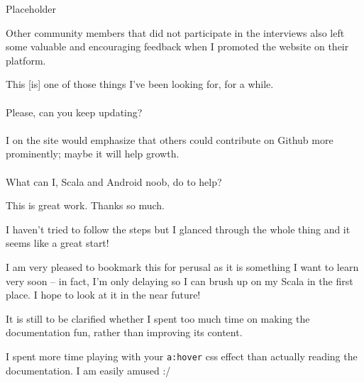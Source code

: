 \hrulefill

\begin{displayquote}

	Placeholder

\end{displayquote}

Other community members that did not participate in the interviews also left some valuable and encouraging feedback when I promoted the website on their platform.

\begin{displayquote}

	This [is] one of those things I've been looking for, for a while. \\\\
	Please, can you keep updating? \\\\
	I on the site would emphasize that others could contribute on Github more prominently; maybe it will help growth. \\\\
	What can I, Scala and Android noob, do to help?

\end{displayquote}

\hrulefill

\begin{displayquote}

	This is great work. Thanks so much.

\end{displayquote}

\hrulefill

\begin{displayquote}

	I haven't tried to follow the steps but I glanced through the whole thing and it seems like a great start!

\end{displayquote}

\hrulefill

\begin{displayquote}

	I am very pleased to bookmark this for perusal as it is something I want to learn very soon -- in fact, I'm only delaying so I can brush up on my Scala in the first place. I hope to look at it in the near future!

\end{displayquote}

It is still to be clarified whether I spent too much time on making the documentation fun, rather than improving its content.

\begin{displayquote}

	I spent more time playing with your \texttt{a:hover} css effect than actually reading the documentation. I am easily amused :/

\end{displayquote}